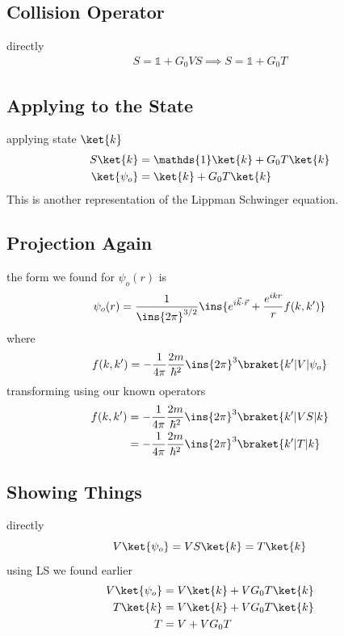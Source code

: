 \subsection{Collision Operator}
directly
\begin{align}
	S = \mathds{1} + G_0 VS \implies S = \mathds{1} + G_0 T
\end{align}
\subsection{Applying to the State}
applying state \(\ket{k}\)
\begin{align}
	S\ket{k} &= \mathds{1}\ket{k} + G_0 T\ket{k} \\
	\ket{\psi_o} &= \ket{k} + G_0 T\ket{k}
\end{align}
This is another representation of the Lippman Schwinger equation.
\subsection{Projection Again}
the form we found for \(\psi_o(r)\) is
\begin{equation}
	\psi_o(r) = \frac{1}{\ins{2\pi}^{3/2}}\ins{e^{i\vec{k}\cdot\vec{r}} + \frac{e^{ikr}}{r}f(k,k')}
\end{equation}
where
\begin{equation}
	f(k,k') = -\frac{1}{4\pi}\frac{2m}{\hbar^2}\ins{2\pi}^3\braket{k'\vert V \vert \psi_o}
\end{equation}
transforming using our known operators
\begin{align}
	f(k,k') &= -\frac{1}{4\pi}\frac{2m}{\hbar^2}\ins{2\pi}^3\braket{k'\vert VS \vert k} \\
	&= -\frac{1}{4\pi}\frac{2m}{\hbar^2}\ins{2\pi}^3\braket{k'\vert T \vert k}
\end{align}
\subsection{Showing Things}
directly
\begin{equation}
	V\ket{\psi_o} = VS\ket{k} = T\ket{k}
\end{equation}
using LS we found earlier
\begin{align}
	V\ket{\psi_o} &= V\ket{k} + V G_0 T\ket{k} \\
	T\ket{k} &= V\ket{k} + V G_0 T\ket{k} \\
	T &= V + V G_0 T
\end{align}
